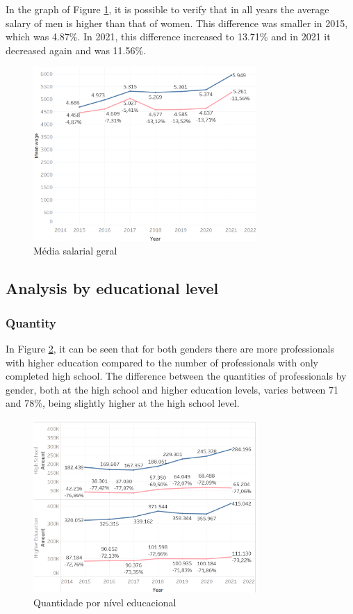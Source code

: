 In the graph of Figure \ref{fig_1_sal}, it is possible to verify that in all years the average salary of men is higher than that of women. This difference was smaller in 2015, which was 4.87\%. In 2021, this difference increased to 13.71\% and in 2021 it decreased again and was 11.56\%.

\begin{figure}[htbp]
	\centerline{
		\includegraphics[width=85mm]{assets/1_sal.PNG}
	}
	\caption{Média salarial geral}
	\label{fig_1_sal}
\end{figure}


\subsection{Analysis by educational level}  \label{sub:educ}

\subsubsection{Quantity}

In Figure \ref{fig_2_qnt_educ}, it can be seen that for both genders there are more professionals with higher education compared to the number of professionals with only completed high school. The difference between the quantities of professionals by gender, both at the high school and higher education levels, varies between 71 and 78\%, being slightly higher at the high school level.

\begin{figure}[htbp]
	\centerline{
		\includegraphics[width=85mm]{assets/2_qnt_educ.PNG}
	}
	\caption{Quantidade por nível educacional}
	\label{fig_2_qnt_educ}
\end{figure}

